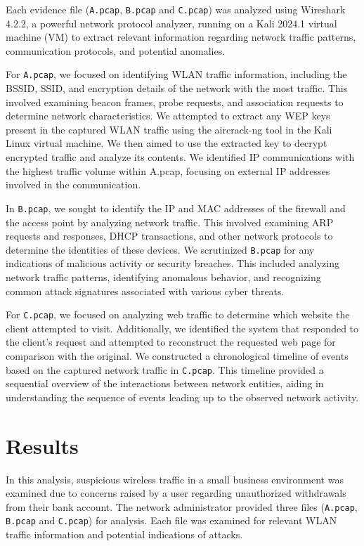 \noindent Each evidence file (\texttt{A.pcap}, \texttt{B.pcap} and \texttt{C.pcap}) was analyzed using Wireshark 4.2.2, a powerful network protocol analyzer, running on a Kali 2024.1 virtual machine (VM) to extract relevant information regarding network traffic patterns, communication protocols, and potential anomalies. 
\newline

\noindent For \texttt{A.pcap}, we focused on identifying WLAN traffic information, including the BSSID, SSID, and encryption details of the network with the most traffic. This involved examining beacon frames, probe requests, and association requests to determine network characteristics. We attempted to extract any WEP keys present in the captured WLAN traffic using the aircrack-ng tool in the Kali Linux virtual machine. We then aimed to use the extracted key to decrypt encrypted traffic and analyze its contents. We identified IP communications with the highest traffic volume within A.pcap, focusing on external IP addresses involved in the communication.
\newline

\noindent In \texttt{B.pcap}, we sought to identify the IP and MAC addresses of the firewall and the access point by analyzing network traffic. This involved examining ARP requests and responses, DHCP transactions, and other network protocols to determine the identities of these devices. We scrutinized \texttt{B.pcap} for any indications of malicious activity or security breaches. This included analyzing network traffic patterns, identifying anomalous behavior, and recognizing common attack signatures associated with various cyber threats.
\newline

\noindent For \texttt{C.pcap}, we focused on analyzing web traffic to determine which website the client attempted to visit. Additionally, we identified the system that responded to the client's request and attempted to reconstruct the requested web page for comparison with the original. We constructed a chronological timeline of events based on the captured network traffic in \texttt{C.pcap}. This timeline provided a sequential overview of the interactions between network entities, aiding in understanding the sequence of events leading up to the observed network activity.


\section{Results}
In this analysis, suspicious wireless traffic in a small business environment was examined due to concerns raised by a user regarding unauthorized withdrawals from their bank account. The network administrator provided three files (\texttt{A.pcap}, \texttt{B.pcap} and \texttt{C.pcap}) for analysis. Each file was examined for relevant WLAN traffic information and potential indications of attacks.

